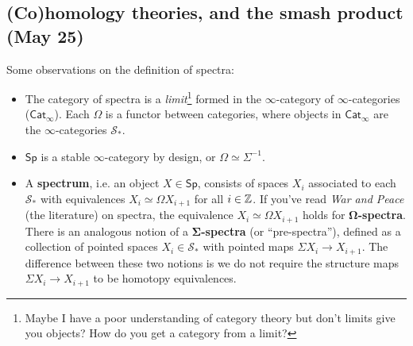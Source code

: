 \subsection{(Co)homology theories, and the smash product (May 25)}
Some observations on the definition of spectra:
\begin{itemize}
\setlength\itemsep{-.2em}
    \item The category of spectra is a \emph{limit}\footnote{Maybe I have a poor understanding of category theory but don't limits give you objects? How do you get a category from a limit?} formed in the $\infty$-category of $\infty$-categories ($\mathsf{Cat} _{\infty}$). Each $\Omega$ is a functor between categories, where objects in $\mathsf{Cat} _{\infty}$ are the $\infty$-categories $\mathcal{S} _*$.
    \item $\mathsf{Sp} $ is a stable $\infty$-category by design, or $\Omega \simeq \Sigma ^{-1}$.
    \item A \textbf{spectrum}, i.e. an object $X \in \mathsf{Sp} $, consists of spaces $X_i $ associated to each $\mathcal{S} _*$ with equivalences $X_i \simeq \Omega X_{i+1}$ for all $i \in \mathbb{Z}$. If you've read \emph{War and Peace} (the literature) on spectra, the equivalence $X_i\simeq \Omega X_{i+1} $ holds for $\mathbf \Omega$\textbf{-spectra}. There is an analogous notion of a $\mathbf \Sigma$\textbf{-spectra} (or ``pre-spectra''), defined as a collection of pointed spaces $X_i \in \mathcal{S} _* $ with pointed maps $\Sigma X_i  \to X_{i+1}$. The difference between these two notions is we do not require the structure maps $\Sigma X_i  \to X_{i+1}$ to be homotopy equivalences.
\end{itemize}

